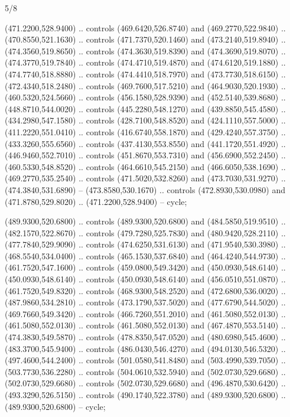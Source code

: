 \begin{flagdescription}{5/8}
\begin{scope}[shift={(m)}]
\begin{scope}[scale=\flagwidth/220,y=0.1mm, x=0.1mm, yscale=-1,shift={(-596,-360)}]
\begin{scope}[cm={{-1.0,0.0,0.0,1.0,(1193.9797,0.0)}}]
\begin{scope}[draw=black,line join=round,line cap=round,line width=0.381\lw]
\begin{scope}[line width=0.534\lw,fill=green]
 (471.2200,528.9400) .. controls (469.6420,526.8740) and
  (469.2770,522.9840) .. (470.8550,521.1630) .. controls (471.7370,520.1460) and
  (473.2140,519.8940) .. (474.3560,519.8650) .. controls (474.3630,519.8390) and
  (474.3690,519.8070) .. (474.3770,519.7840) .. controls (474.4710,519.4870) and
  (474.6120,519.1880) .. (474.7740,518.8880) .. controls (474.4410,518.7970) and
  (473.7730,518.6150) .. (472.4340,518.2480) .. controls (469.7600,517.5210) and
  (464.9030,520.1930) .. (460.5320,524.5660) .. controls (456.1580,528.9390) and
  (452.5140,539.8680) .. (448.8710,544.0020) .. controls (445.2280,548.1270) and
  (439.8850,545.4580) .. (434.2980,547.1580) .. controls (428.7100,548.8520) and
  (424.1110,557.5000) .. (411.2220,551.0410) .. controls (416.6740,558.1870) and
  (429.4240,557.3750) .. (433.3260,555.6560) .. controls (437.4130,553.8550) and
  (441.1720,551.4920) .. (446.9460,552.7010) .. controls (451.8670,553.7310) and
  (456.6900,552.2450) .. (460.5330,548.8520) .. controls (464.6610,545.2150) and
  (466.6050,538.1690) .. (469.2770,535.2540) .. controls (471.5020,532.8260) and
  (473.7030,531.9270) .. (474.3840,531.6890) -- (473.8580,530.1670) .. controls
  (472.8930,530.0980) and (471.8780,529.8020) .. (471.2200,528.9400) -- cycle;

 (489.9300,520.6800) .. controls (489.9300,520.6800) and
  (484.5850,519.9510) .. (482.1570,522.8670) .. controls (479.7280,525.7830) and
  (480.9420,528.2110) .. (477.7840,529.9090) .. controls (474.6250,531.6130) and
  (471.9540,530.3980) .. (468.5540,534.0400) .. controls (465.1530,537.6840) and
  (464.4240,544.9730) .. (461.7520,547.1600) .. controls (459.0800,549.3420) and
  (450.0930,548.6140) .. (450.0930,548.6140) .. controls (450.0930,548.6140) and
  (456.0510,551.0870) .. (461.7520,549.8320) .. controls (468.9300,548.2520) and
  (472.6800,536.0020) .. (487.9860,534.2810) .. controls (473.1790,537.5020) and
  (477.6790,544.5020) .. (469.7660,549.3420) .. controls (466.7260,551.2010) and
  (461.5080,552.0130) .. (461.5080,552.0130) .. controls (461.5080,552.0130) and
  (467.4870,553.5140) .. (474.3830,549.5870) .. controls (478.8350,547.0520) and
  (480.6980,545.4600) .. (483.3700,545.9400) .. controls (486.0430,546.4270) and
  (494.0130,546.5320) .. (497.4600,544.2400) .. controls (501.0580,541.8480) and
  (503.4990,539.7050) .. (503.7730,536.2280) .. controls (504.0610,532.5940) and
  (502.0730,529.6680) .. (502.0730,529.6680) .. controls (502.0730,529.6680) and
  (496.4870,530.6420) .. (493.3290,526.5150) .. controls (490.1740,522.3780) and
  (489.9300,520.6800) .. (489.9300,520.6800) -- cycle;


\end{scope}
\end{scope}
\end{scope}
\end{scope}
\end{scope}
\end{flagdescription}
